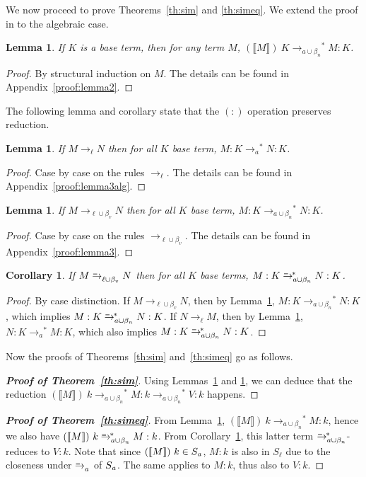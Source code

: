 \documentclass{LMCS}
\newtheorem{lemma}[theorem]{Lemma}
\newtheorem{corollary}[theorem]{Corollary}
\newcommand{\App}[1]{The details can be found in Appendix~\ref{proof:#1}}
\newcommand{\xto}[1]{\ensuremath{\rightarrow_{#1}}}
\newcommand{\simxto}[1]{\ensuremath{\rightarrow_{#1}^{\hspace{-2.2ex}\textrm{\tiny=}}}}
\newcommand{\ssimxto}[1]{\ensuremath{\rightarrow_{#1}^{\hspace{-2.2ex}\textrm{\tiny=}\ *}}}
\newcommand{\tolinred}{\xto{\ell}}
\newcommand{\toalgeq}{\simxto{a}}
\newcommand{\stoalgred}{\ensuremath{\xto{a}^{\ast}}}
\newcommand{\toblinred}{\xto{\ell\cup\beta_v}}
\newcommand{\toblineq}{\simxto{{\ell}\cup\beta_v}}
\newcommand{\stobalgred}{\ensuremath{\xto{a\cup\beta_n}^{\ast}}}
\newcommand{\stobalgeq}{\ensuremath{\ssimxto{a\cup\beta_n}}}
\newcommand{\wt}[1]{\llbracket{#1}\rrbracket}
\begin{document}
We now proceed to prove Theorems~\ref{th:sim} and \ref{th:simeq}. 
We extend the proof in \cite{PlotkinTCS75} to the algebraic case.

\begin{lemma}\label{lem:lemma2}
  If $K$ is a base term, then for any term $M$, $(\wt{M})~K\stobalgred M:K$.
\end{lemma}
\begin{proof}
  By structural induction on $M$. \App{lemma2}.
\end{proof}

The following lemma and corollary state that the $(:)$ operation
preserves reduction.
\begin{lemma}\label{lem:lemma3alg}
  If $M\tolinred N$ then for all $K$ base term, $M:K\stoalgred N:K$.
\end{lemma}
\begin{proof}
  Case by case on the rules $\tolinred$. \App{lemma3alg}.
\end{proof}

\begin{lemma}\label{lem:lemma3}
  If $M\toblinred N$ then for all $K$ base term, $M:K\stobalgred N:K$.
\end{lemma}
\begin{proof}
  Case by case on the rules $\toblinred$. \App{lemma3}.
\end{proof}

\begin{corollary}\label{cor:lemma3}
  If $M\toblineq N$ then for all $K$ base terms, $M:K\stobalgeq N:K$.
\end{corollary}
\begin{proof}
  By case distinction. If $M\toblinred N$, then by
  Lemma~\ref{lem:lemma3}, $M:K\stobalgred N:K$, which implies
  $M:K\stobalgeq N:K$.  If $N\tolinred M$, then by
  Lemma~\ref{lem:lemma3alg}, $N:K\stoalgred M:K$, which also implies
  $M:K\stobalgeq N:K$.
\end{proof}


Now the proofs of Theorems~\ref{th:sim} and~\ref{th:simeq} go as follows.

\begin{proof}[\bf Proof of Theorem~\ref{th:sim}] 
  Using Lemmas~\ref{lem:lemma2} and \ref{lem:lemma3},
  we can deduce that the reduction
  $
  (\wt{M})~k\stobalgred M:k\stobalgred V:k
  $ happens.
\end{proof}

\begin{proof}[\bf Proof of Theorem~\ref{th:simeq}] From
  Lemma~\ref{lem:lemma2}, $(\wt{M})~k \stobalgred M:k$, hence we also have $(\wt{M})~k\stobalgeq M:k$.
  From Corollary~\ref{cor:lemma3}, this latter term $\stobalgeq$-reduces to $V:k$.
  Note that since $(\wt{M})~k\in S_{\it a}$,
  $M:k$ is also in $S_{\ell}$ due to the closeness under $\toalgeq$ of
  $S_{\it a}$. The same applies to $M:k$, thus also to
  $V:k$.
\end{proof}
\end{document}
